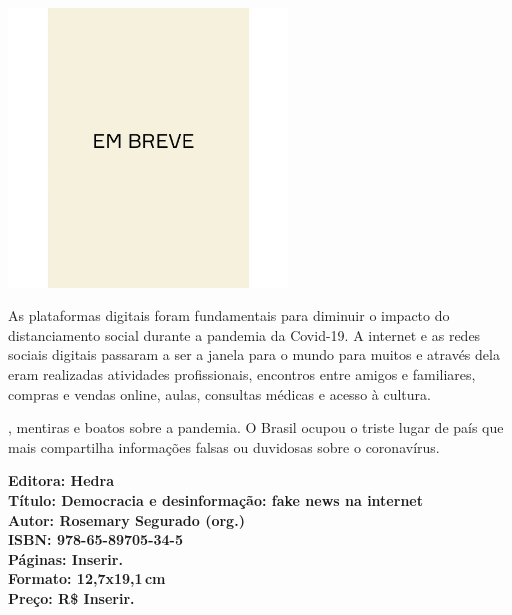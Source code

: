 \begin{center}
\hspace*{-3.6cm}
\hspace*{3.1cm}\includegraphics[width=74mm]{./CAPAS/BREVE.jpg}
\end{center}
\hspace*{-7cm}\hrulefill\hspace*{-7cm}
\medskip

\noindent{}As plataformas digitais foram fundamentais para diminuir o impacto do distanciamento social durante a pandemia da Covid-19. A internet e as redes sociais digitais passaram a ser a janela para o mundo para muitos e através dela eram realizadas atividades profissionais, encontros entre amigos e familiares, compras e vendas online, aulas, consultas médicas e acesso à cultura. 

, mentiras e boatos sobre a pandemia. O Brasil ocupou o triste lugar de país que mais compartilha informações falsas ou duvidosas sobre o coronavírus.

\vfill
\noindent\begin{minipage}[c]{1\linewidth}
{\small\textbf{
\hspace*{-.1cm}Editora: Hedra\\
Título: Democracia e desinformação: fake news na internet\\
Autor: Rosemary Segurado (org.)\\ 
ISBN: 978-65-89705-34-5\\
Páginas: Inserir.\\
Formato: 12,7x19,1\,cm\\
Preço: R\$ Inserir.\\
}}
\end{minipage}
\pagebreak

